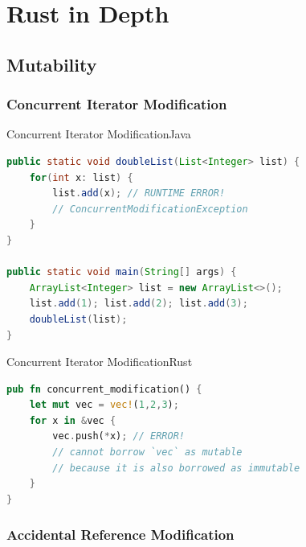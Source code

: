 
\chapter{Rust in Depth}
\label{chap_rv}

\section{Mutability}

\subsection{Concurrent Iterator Modification}


\begin{Frame}[fragile]{Concurrent Iterator Modification}{Java}
\begin{lstlisting}[language=Java]
public static void doubleList(List<Integer> list) {
    for(int x: list) {
        list.add(x); // RUNTIME ERROR!
        // ConcurrentModificationException
    }
}

public static void main(String[] args) {
    ArrayList<Integer> list = new ArrayList<>();
    list.add(1); list.add(2); list.add(3);
    doubleList(list);
}
\end{lstlisting}
\end{Frame}

\begin{Frame}[fragile]{Concurrent Iterator Modification}{Rust}
\begin{lstlisting}[language=Rust]
pub fn concurrent_modification() {
    let mut vec = vec!(1,2,3);
    for x in &vec {
        vec.push(*x); // ERROR!
        // cannot borrow `vec` as mutable
        // because it is also borrowed as immutable
    }
}
\end{lstlisting}
\end{Frame}

\subsection{Accidental Reference Modification}

